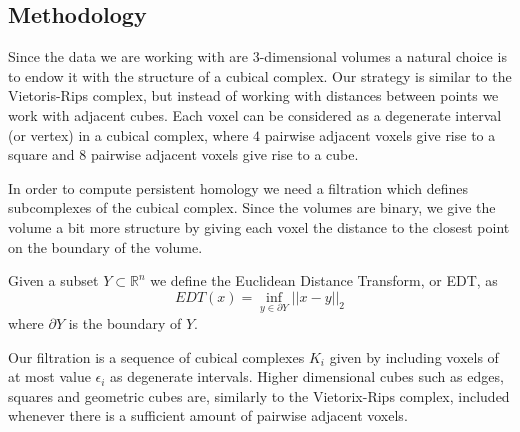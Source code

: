 \subsection{Methodology}
Since the data we are working with are 3-dimensional volumes a natural choice is to endow it with the structure of a cubical complex. Our strategy is similar to the Vietoris-Rips complex, but instead of working with distances between points we work with adjacent cubes. Each voxel can be considered as a degenerate interval (or vertex) in a cubical complex, where $4$ pairwise adjacent voxels give rise to a square and $8$ pairwise adjacent voxels give rise to a cube.

In order to compute persistent homology we need a filtration which defines subcomplexes of the cubical complex. Since the volumes are binary, we give the volume a bit more structure by giving each voxel the distance to the closest point on the boundary of the volume.
\begin{definition}
  Given a subset $Y \subset \mathbb{R}^{n}$ we define the Euclidean Distance Transform, or EDT, as
   \[EDT(x) = \inf_{y \in \partial Y} ||x - y||_2\]
   where $\partial Y$ is the boundary of $Y$.
\end{definition}

Our filtration is a sequence of cubical complexes $K_{i}$ given by including voxels of at most value $\epsilon_{i}$ as degenerate intervals. Higher dimensional cubes such as edges, squares and geometric cubes are, similarly to the Vietorix-Rips complex, included whenever there is a sufficient amount of pairwise adjacent voxels.

